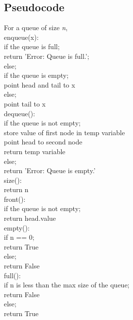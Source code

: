 \documentclass[12pt]{article}
\begin{document}
\subsection{Pseudocode}
For a queue of size \textit{n},\\
enqueue(x):\\
\hspace*{10mm} if the queue is full;\\
\hspace*{20mm} return 'Error: Queue is full.';\\
\hspace*{10mm} else;\\
\hspace*{20mm} if the queue is empty;\\
\hspace*{30mm} point head and tail to x\\
\hspace*{20mm} else;\\
\hspace*{30mm} point tail to x\\
dequeue():\\
\hspace*{10mm} if the queue is not empty;\\
\hspace*{20mm} store value of first node in temp variable\\
\hspace*{20mm} point head to second node\\
\hspace*{20mm} return temp variable\\
\hspace*{10mm} else;\\
\hspace*{20mm} return 'Error: Queue is empty.'\\
size():\\
\hspace*{10mm} return n\\
front():\\
\hspace*{10mm} if the queue is not empty;\\
\hspace*{20mm} return head.value\\
empty():\\
\hspace*{10mm} if n == 0;\\
\hspace*{20mm} return True\\
\hspace*{10mm} else;\\
\hspace*{20mm} return False\\
full():\\
\hspace*{10mm} if n is less than the max size of the queue;\\
\hspace*{20mm} return False \\
\hspace*{10mm} else;\\
\hspace*{20mm} return True\\
\end{document}
